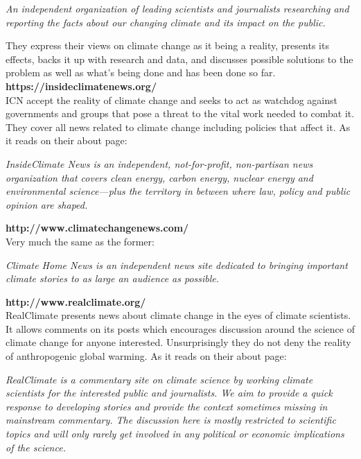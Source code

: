 \documentclass[11pt]{article}
\begin{document}
\begin{displayquote}
\textit{An independent organization of leading scientists and journalists researching and
reporting the facts about our changing climate and its impact on the public.}
\end{displayquote}

They express their views on climate change as it being a reality, presents its
effects, backs it up with research and data, and discusses possible solutions to the
problem as well as what's being done and has been done so far.\\

\textbf{https://insideclimatenews.org/}\\
ICN accept the reality of climate change and seeks to act as watchdog against
governments and groups that pose a threat to the vital work needed to combat it.
They cover all news related to climate change including policies that affect it.
As it reads on their about page:

\begin{displayquote}
\textit{InsideClimate News is an independent, not-for-profit, non-partisan news organization
that covers clean energy, carbon energy, nuclear energy and environmental science—plus
the territory in between where law, policy and public opinion are shaped.}
\end{displayquote}

\textbf{http://www.climatechangenews.com/}\\
Very much the same as the former:

\begin{displayquote}
\textit{Climate Home News is an independent news site dedicated to bringing important climate
stories to as large an audience as possible.}
\end{displayquote}


\textbf{http://www.realclimate.org/}\\
RealClimate presents news about climate change in the eyes of climate scientists. It
allows comments on its posts which encourages discussion around the science of
climate change for anyone interested. Unsurprisingly they do not deny the reality of
anthropogenic global warming.  As it reads on their about page:

\begin{displayquote}
\textit{RealClimate is a commentary site on climate science by working climate scientists for
the interested public and journalists. We aim to provide a quick response to developing
stories and provide the context sometimes missing in mainstream commentary. The
discussion here is mostly restricted to scientific topics and will only rarely get
involved in any political or economic implications of the science.}
\end{displayquote}
\end{document}

